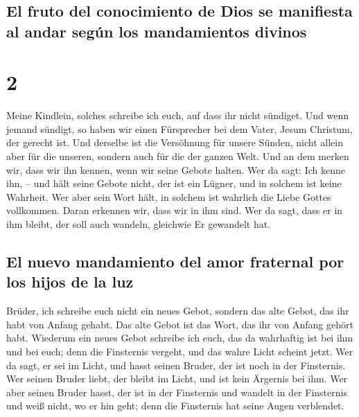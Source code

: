 \hypertarget{el-fruto-del-conocimiento-de-dios-se-manifiesta-al-andar-seguxfan-los-mandamientos-divinos}{%
\subsection{El fruto del conocimiento de Dios se manifiesta al andar
según los mandamientos
divinos}\label{el-fruto-del-conocimiento-de-dios-se-manifiesta-al-andar-seguxfan-los-mandamientos-divinos}}

\hypertarget{section-1}{%
\section{2}\label{section-1}}

 Meine Kindlein, solches schreibe ich euch, auf dass ihr
nicht sündiget. Und wenn jemand sündigt, so haben wir einen Fürsprecher
bei dem Vater, Jesum Christum, der gerecht ist.  Und
derselbe ist die Versöhnung für unsere Sünden, nicht allein aber für die
unseren, sondern auch für die der ganzen Welt.  Und an dem
merken wir, dass wir ihn kennen, wenn wir seine Gebote halten.
 Wer da sagt: Ich kenne ihn, -- und hält seine Gebote
nicht, der ist ein Lügner, und in solchem ist keine Wahrheit.
 Wer aber sein Wort hält, in solchem ist wahrlich die
Liebe Gottes vollkommen. Daran erkennen wir, dass wir in ihm sind.
 Wer da sagt, dass er in ihm bleibt, der soll auch
wandeln, gleichwie Er gewandelt hat.

\hypertarget{el-nuevo-mandamiento-del-amor-fraternal-por-los-hijos-de-la-luz}{%
\subsection{El nuevo mandamiento del amor fraternal por los hijos de la
luz}\label{el-nuevo-mandamiento-del-amor-fraternal-por-los-hijos-de-la-luz}}

 Brüder, ich schreibe euch nicht ein neues Gebot, sondern
das alte Gebot, das ihr habt von Anfang gehabt. Das alte Gebot ist das
Wort, das ihr von Anfang gehört habt.  Wiederum ein neues
Gebot schreibe ich euch, das da wahrhaftig ist bei ihm und bei euch;
denn die Finsternis vergeht, und das wahre Licht scheint jetzt.
 Wer da sagt, er sei im Licht, und hasst seinen Bruder,
der ist noch in der Finsternis.  Wer seinen Bruder liebt,
der bleibt im Licht, und ist kein Ärgernis bei ihm.  Wer
aber seinen Bruder hasst, der ist in der Finsternis und wandelt in der
Finsternis und weiß nicht, wo er hin geht; denn die Finsternis hat seine
Augen verblendet.

